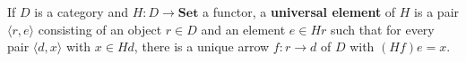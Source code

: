 If $D$ is a category and $H: D \to \mathbf{Set}$ a functor, a \textbf{universal element} of $H$ is a pair $\langle r, e \rangle$ consisting of an object $r \in D$ and an element $e \in Hr$ such that for every pair $\langle d, x \rangle$ with $x \in Hd$, there is a unique arrow $f: r \to d$ of $D$ with $(Hf)e = x$.